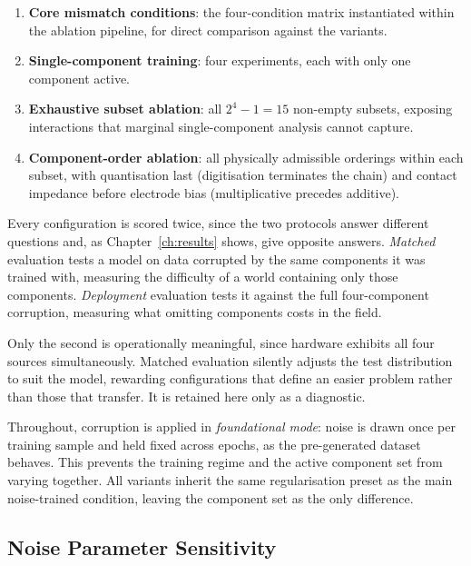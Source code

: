 \begin{enumerate}
    \item \textbf{Core mismatch conditions}: the four-condition matrix instantiated within the ablation pipeline, for direct comparison against the variants.

    \item \textbf{Single-component training}: four experiments, each with only one component active.

    \item \textbf{Exhaustive subset ablation}: all $2^4 - 1 = 15$ non-empty subsets, exposing interactions that marginal single-component analysis cannot capture.

    \item \textbf{Component-order ablation}: all physically admissible orderings within each subset, with quantisation last (digitisation terminates the chain) and contact impedance before electrode bias (multiplicative precedes additive).
\end{enumerate}

Every configuration is scored twice, since the two protocols answer different questions and, as Chapter~\ref{ch:results} shows, give opposite answers. \emph{Matched} evaluation tests a model on data corrupted by the same components it was trained with, measuring the difficulty of a world containing only those components. \emph{Deployment} evaluation tests it against the full four-component corruption, measuring what omitting components costs in the field.

Only the second is operationally meaningful, since hardware exhibits all four sources simultaneously. Matched evaluation silently adjusts the test distribution to suit the model, rewarding configurations that define an easier problem rather than those that transfer. It is retained here only as a diagnostic.

Throughout, corruption is applied in \emph{foundational mode}: noise is drawn once per training sample and held fixed across epochs, as the pre-generated dataset behaves. This prevents the training regime and the active component set from varying together. All variants inherit the same regularisation preset as the main noise-trained condition, leaving the component set as the only difference.

\subsection{Noise Parameter Sensitivity}
\label{sec:method-noise-sensitivity}

